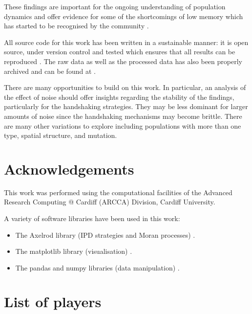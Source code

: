 \documentclass[10pt,journal]{IEEEtran}
\begin{document}
These findings are important for the ongoing understanding of
population dynamics and offer evidence for some of the shortcomings of low
memory which has started to be recognised by the community \cite{Hilbe2017}.

All source code for this work has been written in a sustainable manner: it is
open source, under version control and tested which ensures that all results can
be reproduced \cite{Prlic2012, Sandve2013, Wilson2014}. The raw data as well as
the processed data has also been properly archived and can be found
at \cite{data}.

There are many opportunities to build on this work. In particular, an analysis
of the effect of noise should offer insights regarding the stability of the findings,
particularly for the handshaking strategies. They may be less dominant for
larger amounts of noise since the handshaking mechanisms may become brittle.
There are many other variations to explore including populations with more
than one type, spatial structure, and mutation.

\section*{Acknowledgements}

This work was performed using the computational facilities of the Advanced
Research Computing @ Cardiff (ARCCA) Division, Cardiff University.

A variety of software libraries have been used in this work:

\begin{itemize}
    \item The Axelrod library (IPD strategies and Moran processes)
        \cite{axelrodproject}.
    \item The matplotlib library (visualisation) \cite{hunter2007matplotlib}.
    \item The pandas and numpy libraries (data manipulation)
        \cite{mckinney2010data, walt2011numpy}.
\end{itemize}

\newpage



\appendix

\section{List of players}\label{app:list_of_players}

\begin{enumerate}
    
\end{enumerate}
\end{document}
